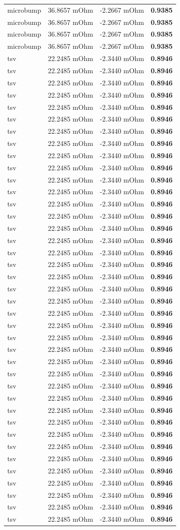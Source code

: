 \documentclass[10pt,]{article}
\begin{document}
\begin{longtable}[]{@{}llll@{}}
microbump & 36.8657 mOhm & -2.2667 mOhm & \textbf{0.9385}\tabularnewline
microbump & 36.8657 mOhm & -2.2667 mOhm & \textbf{0.9385}\tabularnewline
microbump & 36.8657 mOhm & -2.2667 mOhm & \textbf{0.9385}\tabularnewline
microbump & 36.8657 mOhm & -2.2667 mOhm & \textbf{0.9385}\tabularnewline
tsv & 22.2485 mOhm & -2.3440 mOhm & \textbf{0.8946}\tabularnewline
tsv & 22.2485 mOhm & -2.3440 mOhm & \textbf{0.8946}\tabularnewline
tsv & 22.2485 mOhm & -2.3440 mOhm & \textbf{0.8946}\tabularnewline
tsv & 22.2485 mOhm & -2.3440 mOhm & \textbf{0.8946}\tabularnewline
tsv & 22.2485 mOhm & -2.3440 mOhm & \textbf{0.8946}\tabularnewline
tsv & 22.2485 mOhm & -2.3440 mOhm & \textbf{0.8946}\tabularnewline
tsv & 22.2485 mOhm & -2.3440 mOhm & \textbf{0.8946}\tabularnewline
tsv & 22.2485 mOhm & -2.3440 mOhm & \textbf{0.8946}\tabularnewline
tsv & 22.2485 mOhm & -2.3440 mOhm & \textbf{0.8946}\tabularnewline
tsv & 22.2485 mOhm & -2.3440 mOhm & \textbf{0.8946}\tabularnewline
tsv & 22.2485 mOhm & -2.3440 mOhm & \textbf{0.8946}\tabularnewline
tsv & 22.2485 mOhm & -2.3440 mOhm & \textbf{0.8946}\tabularnewline
tsv & 22.2485 mOhm & -2.3440 mOhm & \textbf{0.8946}\tabularnewline
tsv & 22.2485 mOhm & -2.3440 mOhm & \textbf{0.8946}\tabularnewline
tsv & 22.2485 mOhm & -2.3440 mOhm & \textbf{0.8946}\tabularnewline
tsv & 22.2485 mOhm & -2.3440 mOhm & \textbf{0.8946}\tabularnewline
tsv & 22.2485 mOhm & -2.3440 mOhm & \textbf{0.8946}\tabularnewline
tsv & 22.2485 mOhm & -2.3440 mOhm & \textbf{0.8946}\tabularnewline
tsv & 22.2485 mOhm & -2.3440 mOhm & \textbf{0.8946}\tabularnewline
tsv & 22.2485 mOhm & -2.3440 mOhm & \textbf{0.8946}\tabularnewline
tsv & 22.2485 mOhm & -2.3440 mOhm & \textbf{0.8946}\tabularnewline
tsv & 22.2485 mOhm & -2.3440 mOhm & \textbf{0.8946}\tabularnewline
tsv & 22.2485 mOhm & -2.3440 mOhm & \textbf{0.8946}\tabularnewline
tsv & 22.2485 mOhm & -2.3440 mOhm & \textbf{0.8946}\tabularnewline
tsv & 22.2485 mOhm & -2.3440 mOhm & \textbf{0.8946}\tabularnewline
tsv & 22.2485 mOhm & -2.3440 mOhm & \textbf{0.8946}\tabularnewline
tsv & 22.2485 mOhm & -2.3440 mOhm & \textbf{0.8946}\tabularnewline
tsv & 22.2485 mOhm & -2.3440 mOhm & \textbf{0.8946}\tabularnewline
tsv & 22.2485 mOhm & -2.3440 mOhm & \textbf{0.8946}\tabularnewline
tsv & 22.2485 mOhm & -2.3440 mOhm & \textbf{0.8946}\tabularnewline
tsv & 22.2485 mOhm & -2.3440 mOhm & \textbf{0.8946}\tabularnewline
tsv & 22.2485 mOhm & -2.3440 mOhm & \textbf{0.8946}\tabularnewline
tsv & 22.2485 mOhm & -2.3440 mOhm & \textbf{0.8946}\tabularnewline
tsv & 22.2485 mOhm & -2.3440 mOhm & \textbf{0.8946}\tabularnewline
tsv & 22.2485 mOhm & -2.3440 mOhm & \textbf{0.8946}\tabularnewline
tsv & 22.2485 mOhm & -2.3440 mOhm & \textbf{0.8946}\tabularnewline
tsv & 22.2485 mOhm & -2.3440 mOhm & \textbf{0.8946}\tabularnewline
tsv & 22.2485 mOhm & -2.3440 mOhm & \textbf{0.8946}\tabularnewline
tsv & 22.2485 mOhm & -2.3440 mOhm & \textbf{0.8946}\tabularnewline
\bottomrule
\end{longtable}
\end{document}
